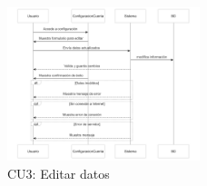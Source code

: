 \begin{figure}[h]
    \centering
    \includegraphics[width=0.5\textwidth]{txt/cu3.png} %
    \caption{CU3: Editar datos}
    \label{fig: 1}
\end{figure}




